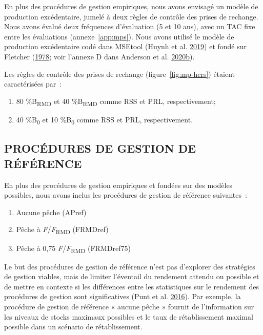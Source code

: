 \documentclass[french,11pt]{book}
\begin{document}
En plus des procédures de gestion empiriques, nous avons envisagé un modèle de production excédentaire, jumelé à deux règles de contrôle des prises de rechange. Nous avons évalué deux fréquences d'évaluation (5 et 10 ans), avec un TAC fixe entre les évaluations (annexe~\ref{app:mps}). Nous avons utilisé le modèle de production excédentaire codé dans MSEtool (Huynh et al. \protect\hyperlink{ref-huynh_msetool_2019}{2019}) et fondé sur Fletcher (\protect\hyperlink{ref-fletcher1978}{1978}; voir l'annexe D dans Anderson et al. \protect\hyperlink{ref-anderson2020gfmp}{2020}\protect\hyperlink{ref-anderson2020gfmp}{b}).

Les règles de contrôle des prises de rechange (figure~\ref{fig:mp-hcrs}) étaient caractérisées par~:
\begin{enumerate}
\def\labelenumi{\arabic{enumi}.}

\item
  80 \%B\textsubscript{RMD} et 40 \%B\textsubscript{RMD} comme RSS et PRL, respectivement;
\item
  40 \%B\textsubscript{0} et 10 \%B\textsubscript{0} comme RSS et PRL, respectivement.
\end{enumerate}
\hypertarget{procuxe9dures-de-gestion-de-ruxe9fuxe9rence}{%
\subsection{PROCÉDURES DE GESTION DE RÉFÉRENCE}\label{procuxe9dures-de-gestion-de-ruxe9fuxe9rence}}

En plus des procédures de gestion empiriques et fondées sur des modèles possibles, nous avons inclus les procédures de gestion de référence suivantes~:
\begin{enumerate}
\def\labelenumi{\arabic{enumi}.}

\item
  Aucune pêche (APref)
\item
  Pêche à \emph{F}/\emph{F}\textsubscript{RMD} (FRMDref)
\item
  Pêche à 0,75 \emph{F}/\emph{F}\textsubscript{RMD} (FRMDref75)
\end{enumerate}
Le but des procédures de gestion de référence n'est pas d'explorer des stratégies de gestion viables, mais de limiter l'éventail du rendement attendu ou possible et de mettre en contexte si les différences entre les statistiques sur le rendement des procédures de gestion sont significatives (Punt et al. \protect\hyperlink{ref-punt2016}{2016}). Par exemple, la procédure de gestion de référence « aucune pêche » fournit de l'information sur les niveaux de stocks maximaux possibles et le taux de rétablissement maximal possible dans un scénario de rétablissement.
\end{document}
